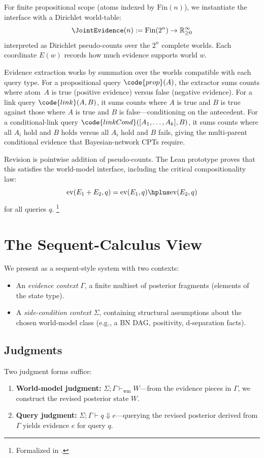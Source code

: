 \documentclass[11pt,openany]{report}
\begin{document}
For finite propositional scope (atoms indexed by $\mathrm{Fin}(n)$), we
instantiate the \WorldModel{} interface with a Dirichlet world-table:
\[
  \JointEvidence(n) := \mathrm{Fin}(2^n) \to \mathbb{R}_{\ge 0}^{\infty}
\]
interpreted as Dirichlet pseudo-counts over the $2^n$ complete worlds.
Each coordinate $E(w)$ records how much evidence supports world $w$.

Evidence extraction works by summation over the worlds compatible with
each query type.  For a propositional query $\code{prop}(A)$, the
extractor sums counts where atom~$A$ is true (positive evidence) versus
false (negative evidence).  For a link query $\code{link}(A, B)$, it sums
counts where $A$ is true and $B$ is true against those where $A$ is true
and $B$ is false---conditioning on the antecedent.  For a conditional-link
query $\code{linkCond}([A_1, \ldots, A_k], B)$, it sums counts where all
$A_i$ hold and $B$ holds versus all $A_i$ hold and $B$ fails, giving the
multi-parent conditional evidence that Bayesian-network CPTs require.

Revision is pointwise addition of pseudo-counts.  The Lean prototype proves
that this satisfies the world-model interface, including the critical
compositionality law:
\[
  \mathrm{ev}(E_1 + E_2, q) = \mathrm{ev}(E_1, q) \hplus \mathrm{ev}(E_2, q)
\]
for all queries $q$.%
\footnote{Formalized in .}

\section{The Sequent-Calculus View}

We present \xiPLN{} as a sequent-style system with two contexts:
\begin{itemize}
\item An \emph{evidence context} $\Gamma$, a finite multiset of posterior
  fragments (elements of the state type).
\item A \emph{side-condition context} $\Sigma$, containing structural
  assumptions about the chosen world-model class (e.g., a BN DAG,
  positivity, d-separation facts).
\end{itemize}

\subsection{Judgments}

Two judgment forms suffice:
\begin{enumerate}
\item \textbf{World-model judgment:}
  $\Sigma; \Gamma \vdash_{\mathrm{wm}} W$---from the evidence pieces in
  $\Gamma$, we construct the revised posterior state $W$.

\item \textbf{Query judgment:}
  $\Sigma; \Gamma \vdash q \Downarrow e$---querying the revised posterior
  derived from $\Gamma$ yields evidence $e$ for query $q$.
\end{enumerate}
\end{document}
